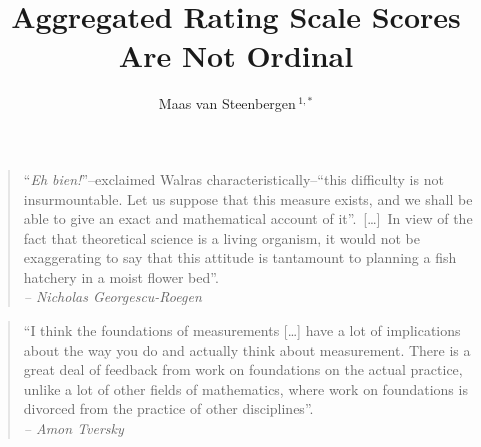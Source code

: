 \documentclass[utf8]{FrontiersinVancouver}
\def\firstAuthorLast{van Steenbergen} %
\def\Authors{Maas van Steenbergen\,$^{1,*}$}
\begin{document}
\onecolumn
{}

\title[]{Aggregated Rating Scale Scores Are Not Ordinal} 

\author[\firstAuthorLast]{\Authors} %
\address{} %
\correspondance{} %

\extraAuth{}%

\maketitle


\begin{quote}
    ``\textit{Eh bien!}''--exclaimed Walras characteristically--``this difficulty is not insurmountable. Let us suppose that this measure exists, and we shall be able to give an exact and mathematical account of it''.\ 
    [\dots]\ In view of the fact that theoretical science is a living organism, it would not be exaggerating to say that this attitude is tantamount to planning a fish hatchery in a moist flower bed''.\\
    \textit{-- Nicholas Georgescu-Roegen}

\end{quote}
\begin{quote}
    ``I think the foundations of measurements [\ldots] have a lot of implications about the way you do and actually think about measurement. There is a great deal of feedback from work on foundations on the actual practice, unlike a lot of other fields of mathematics, where work on foundations is divorced from the practice of other disciplines''.\\
    \textit{-- Amon Tversky}
\end{quote}
\end{document}
